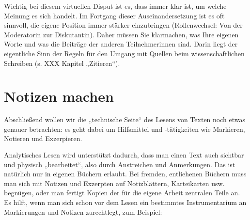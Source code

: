 \documentclass[]{book}
\theoremstyle{definition}
\theoremstyle{definition}
\theoremstyle{definition}
\theoremstyle{remark}
\begin{document}
Wichtig bei diesem virtuellen Disput ist es, dass immer klar ist, um
welche Meinung es sich handelt. Im Fortgang dieser Auseinandersetzung
ist es oft sinnvoll, die eigene Position immer stärker einzubringen
(Rollenwechsel: Von der Moderatorin zur Diskutantin). Daher müssen Sie
klarmachen, was Ihre eigenen Worte und was die Beiträge der anderen
Teilnehmerinnen sind. Darin liegt der eigentliche Sinn der Regeln für
den Umgang mit Quellen beim wissenschaftlichen Schreiben (s. XXX Kapitel
„Zitieren``).

\section{Notizen machen}\label{notizen-machen}

Abschließend wollen wir die „technische Seite`` des Lesens von Texten
noch etwas genauer betrachten: es geht dabei um Hilfsmittel und
-tätigkeiten wie Markieren, Notieren und Exzerpieren.

Analytisches Lesen wird unterstützt dadurch, dass man einen Text auch
sichtbar und physisch „bearbeitet``, also durch Anstreichen und
Anmerkungen. Das ist natürlich nur in eigenen Büchern erlaubt. Bei
fremden, entliehenen Büchern muss man sich mit Notizen und Exzerpten auf
Notizblättern, Karteikarten usw. begnügen, oder man fertigt Kopien der
für die eigene Arbeit zentralen Teile an. Es hilft, wenn man sich schon
vor dem Lesen ein bestimmtes Instrumentarium an Markierungen und Notizen
zurechtlegt, zum Beispiel:
\end{document}
